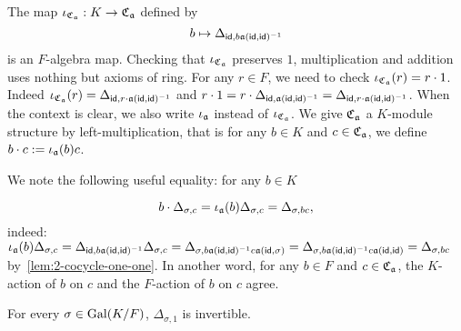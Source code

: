 \begin{construction}[$K$-embedding]\label{con:cross-product-iota}
  The map $\iota_{\operatorname{\mathfrak{C}}_{\mathfrak{a}}}: K \to \operatorname{\mathfrak{C}}_{\mathfrak{a}}$ defined by
  \[
    b \mapsto \Delta_{\mathsf{id}, b\mathfrak{a}(\mathsf{id},\mathsf{id})^{-1}}
  \]
  is an $F$-algebra map.
  Checking that $\iota_{\operatorname{\mathfrak{C}}_{\mathfrak{a}}}$ preserves $1$, multiplication and addition uses nothing but axioms of ring.
  For any $r \in F$, we need to check $\iota_{\operatorname{\mathfrak{C}}_{\mathfrak{a}}}(r) = r \cdot 1$. Indeed $\iota_{\operatorname{\mathfrak{C}}_{\mathfrak{a}}}(r) = \Delta_{\mathsf{id}, r\cdot \mathfrak{a}(\mathsf{id},\mathsf{id})^{-1}}$ and $r\cdot 1 = r \cdot \Delta_{\mathsf{id},\mathfrak{a}(\mathsf{id},\mathsf{id})^{-1}} =\Delta_{\mathsf{id},r\cdot\mathfrak{a}(\mathsf{id},\mathsf{id})^{-1}}$.
  When the context is clear, we also write $\iota_{\mathfrak{a}}$ instead of $\iota_{\operatorname{\mathfrak{C}}_{\mathfrak{a}}}$. We give $\operatorname{\mathfrak{C}}_{\mathfrak{a}}$ a $K$-module structure by left-multiplication, that is for any $b \in K$ and $c\in\operatorname{\mathfrak{C}}_{\mathfrak{a}}$, we define $b\cdot c := \iota_{\mathfrak{a}}(b)c$.


  We note the following useful equality: for any $b \in K$

  \[
    b\cdot \Delta_{\sigma,c} = \iota_{\mathfrak{a}}(b)\Delta_{\sigma, c} = \Delta_{\sigma, bc},
  \]
  indeed:
  $\iota_{\mathfrak{a}}(b)\Delta_{\sigma, c} = \Delta_{\mathsf{id},b \mathfrak{a}(\mathsf{id},\mathsf{id})^{-1}}\Delta_{\sigma, c} = \Delta_{\sigma, b\mathfrak{a}(\mathsf{id},\mathsf{id})^{-1}c\mathfrak{a}(\mathsf{id},\sigma)} = \Delta_{\sigma,b\mathfrak{a}(\mathsf{id},\mathsf{id})^{-1}c\mathfrak{a}(\mathsf{id},\mathsf{id})} = \Delta_{\sigma, bc}$ by~\cref{lem:2-cocycle-one-one}. In another word, for any $b \in F$ and $c \in \operatorname{\mathfrak{C}}_{\mathfrak{a}}$, the $K$-action of $b$ on $c$ and the $F$-action of $b$ on $c$ agree.

  \leanok {}
 \end{construction}

 \begin{lemma}
   \label{lem:cross-product-delta-invertible}
   For every $\sigma \in \operatorname{Gal}(K/F)$, $\Delta_{\sigma,1}$ is invertible.
   \leanok
 \end{lemma}

